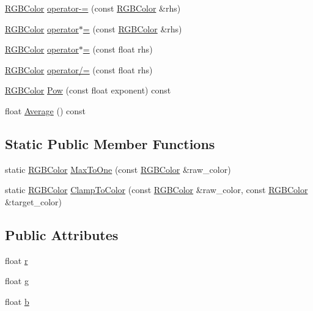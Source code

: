 \begin{DoxyCompactItemize}
\item 
\hyperlink{class_r_g_b_color}{R\+G\+B\+Color} \hyperlink{group___utilities_ga1a36960da5c88b5e3e825ad01845de29}{operator-\/=} (const \hyperlink{class_r_g_b_color}{R\+G\+B\+Color} \&rhs)
\item 
\hyperlink{class_r_g_b_color}{R\+G\+B\+Color} \hyperlink{class_r_g_b_color_a3a748bcc5393c391b8d7edb5dc162246}{operator$\ast$=} (const \hyperlink{class_r_g_b_color}{R\+G\+B\+Color} \&rhs)
\item 
\hyperlink{class_r_g_b_color}{R\+G\+B\+Color} \hyperlink{group___utilities_ga1b8ab73352d66c6d0125d6f061a1982f}{operator$\ast$=} (const float rhs)
\item 
\hyperlink{class_r_g_b_color}{R\+G\+B\+Color} \hyperlink{group___utilities_gad071890eadae01f96bf3af8ba52503e0}{operator/=} (const float rhs)
\item 
\hyperlink{class_r_g_b_color}{R\+G\+B\+Color} \hyperlink{class_r_g_b_color_a70f29cb9404fac9686687bc58efaaca2}{Pow} (const float exponent) const
\item 
float \hyperlink{group___utilities_gaea22cae2344d4a4187b50732820e50c8}{Average} () const
\end{DoxyCompactItemize}
\subsection*{Static Public Member Functions}
\begin{DoxyCompactItemize}
\item 
static \hyperlink{class_r_g_b_color}{R\+G\+B\+Color} \hyperlink{class_r_g_b_color_a767e650d2607d6a9138ab2929af21963}{Max\+To\+One} (const \hyperlink{class_r_g_b_color}{R\+G\+B\+Color} \&raw\+\_\+color)
\item 
static \hyperlink{class_r_g_b_color}{R\+G\+B\+Color} \hyperlink{class_r_g_b_color_acf9d559b664ee64da542949952bdf0f4}{Clamp\+To\+Color} (const \hyperlink{class_r_g_b_color}{R\+G\+B\+Color} \&raw\+\_\+color, const \hyperlink{class_r_g_b_color}{R\+G\+B\+Color} \&target\+\_\+color)
\end{DoxyCompactItemize}
\subsection*{Public Attributes}
\begin{DoxyCompactItemize}
\item 
float \hyperlink{class_r_g_b_color_a9c0b69a5100747dc0dee8d151129f8f2}{r}
\item 
float \hyperlink{class_r_g_b_color_a744b090c52455e09a4eacf55cabc39f9}{g}
\item 
float \hyperlink{class_r_g_b_color_adec4491768d446770055a6b23f18927d}{b}
\end{DoxyCompactItemize}
